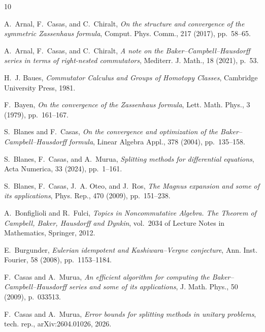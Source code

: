 \documentclass[11pt]{article}
\newcommand{\blue}[1]{{\color{blue} #1}}
\begin{document}
 

%

%
%


\begin{thebibliography}{10}

{\sc A.~Arnal, F.~Casas, and C.~Chiralt}, {\em On the structure and convergence
  of the symmetric {Z}assenhaus formula}, Comput. Phys. Comm., 217 (2017),
  pp.~58--65.

{\sc A.~Arnal, F.~Casas, and C.~Chiralt}, {\em A note on the
  {B}aker--{C}ampbell--{H}ausdorff series in terms of right-nested
  commutators}, Mediterr. J. Math., 18 (2021), p.~53.

{\sc H.~J. Baues}, {\em Commutator Calculus and Groups of Homotopy Classes},
  Cambridge University Press, 1981.

{\sc F.~Bayen}, {\em On the convergence of the {Z}assenhaus formula}, Lett.
  Math. Phys., 3 (1979), pp.~161--167.

{\sc S.~Blanes and F.~Casas}, {\em On the convergence and optimization of the
  {B}aker--{C}ampbell--{H}ausdorff formula}, Linear Algebra Appl., 378 (2004),
  pp.~135--158.

{\sc S.~Blanes, F.~Casas, and A.~Murua}, {\em Splitting methods for
  differential equations}, Acta Numerica, 33 (2024), pp.~1--161.

{\sc S.~Blanes, F.~Casas, J.~A. Oteo, and J.~Ros}, {\em The {M}agnus expansion
  and some of its applications}, Phys. Rep., 470 (2009), pp.~151--238.

{\sc A.~Bonfiglioli and R.~Fulci}, {\em Topics in {N}oncommutative {A}lgebra.
  {T}he {T}heorem of {C}ampbell, {B}aker, {H}ausdorff and {D}ynkin}, vol.~2034
  of Lecture Notes in Mathematics, Springer, 2012.

{\sc E.~Burgunder}, {\em Eulerian idempotent and {K}ashiwara--{V}ergne
  conjecture}, Ann. Inst. Fourier, 58 (2008), pp.~1153--1184.

{\sc F.~Casas and A.~Murua}, {\em An efficient algorithm for computing the
  {B}aker--{C}ampbell--{H}ausdorff series and some of its applications}, J.
  Math. Phys., 50 (2009), p.~033513.

{\sc F.~Casas and A.~Murua}, {\em Error bounds for
  splitting methods in unitary problems}, tech. rep., arXiv:2604.01026, 2026.


\end{thebibliography}
\end{document}
